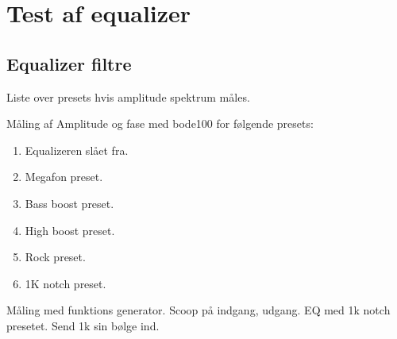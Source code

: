 \chapter{Test af equalizer}\label{sec:test_eq}



\section{Equalizer filtre}


Liste over presets hvis amplitude spektrum måles.

Måling af Amplitude og fase med bode100 for følgende presets:
\begin{enumerate}
    \item Equalizeren slået fra.
    \item Megafon preset.
    \item Bass boost preset.
    \item High boost preset.
    \item Rock preset. 
    \item 1K notch preset.
\end{enumerate}



Måling med funktions generator. Scoop på indgang, udgang.
EQ med 1k notch presetet. 
Send 1k sin bølge ind. 